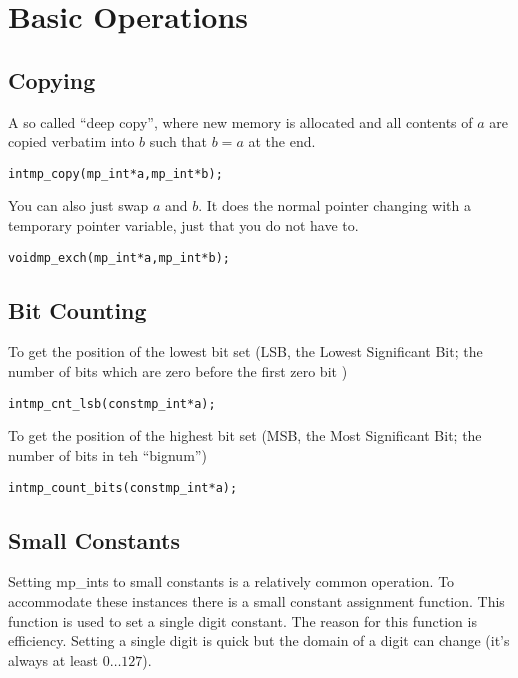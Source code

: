 \documentclass[synpaper]{book}
\begin{document}
\chapter{Basic Operations}
\section{Copying}

A so called ``deep copy'', where new memory is allocated and all contents of $a$ are copied verbatim into $b$ such that $b = a$ at the end.

\begin{alltt}
int mp_copy (mp_int * a, mp_int *b);
\end{alltt}

You can also just swap $a$ and $b$. It does the normal pointer changing with a temporary pointer variable, just that you do not have to.

\begin{alltt}
void mp_exch (mp_int * a, mp_int *b);
\end{alltt}

\section{Bit Counting}

To get the position of the lowest bit set (LSB, the Lowest Significant Bit; the number of bits which are zero before the first zero bit )

\begin{alltt}
int mp_cnt_lsb(const mp_int *a);
\end{alltt}

To get the position of the highest bit set (MSB, the Most Significant Bit; the number of bits in teh ``bignum'')

\begin{alltt}
int mp_count_bits(const mp_int *a);
\end{alltt}


\section{Small Constants}
Setting mp\_ints to small constants is a relatively common operation.  To accommodate these instances there is a
small constant assignment function.  This function is used to set a single digit constant.
The reason for this function is efficiency.  Setting a single digit is quick but the
domain of a digit can change (it's always at least $0 \ldots 127$).
\end{document}
